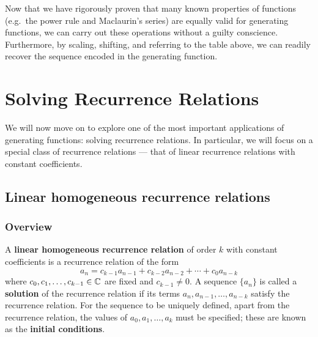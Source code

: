 \documentclass[a4paper, 12pt]{report}
\begin{document}
Now that we have rigorously proven that many known properties of functions (e.g.\ the power rule and Maclaurin's series) are equally valid for generating functions, we can carry out these operations without a guilty conscience. Furthermore, by scaling, shifting, and referring to the table above, we can readily recover the sequence encoded in the generating function.





{\let\clearpage\relax\chapter{Solving Recurrence Relations}\label{ch:recurrence}}
We will now move on to explore one of the most important applications of generating functions: solving recurrence relations. In particular, we will focus on a special class of recurrence relations --- that of linear recurrence relations with constant coefficients.

\clearpage

\section{Linear homogeneous recurrence relations}
\subsection{Overview}
\begin{defn}\label{def:lin-homo-recur}
A \textbf{linear homogeneous recurrence relation} of order $k$ with constant coefficients is a recurrence relation of the form \[a_n = c_{k - 1} a_{n - 1} + c_{k - 2} a_{n - 2} + \cdots + c_0 a_{n - k}\]
where $c_0, c_1, \dots, c_{k - 1} \in \mathbb{C}$ are fixed and $c_{k - 1} \neq 0$.
A sequence $\{a_n\}$ is called a \textbf{solution} of the recurrence relation if its terms $a_n, a_{n - 1}, \dots, a_{n - k}$ satisfy the recurrence relation. For the sequence to be uniquely defined, apart from the recurrence relation, the values of $a_0, a_1, \dots, a_k$ must be specified; these are known as the \textbf{initial conditions}.
\end{defn}
\end{document}
